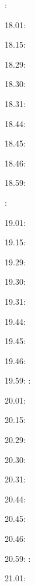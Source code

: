 \documentclass[italian]{article}
\begin{document}
:    

18.01:      

18.15:      

18.29:      

18.30:     

18.31:     

18.44:     

18.45:     

18.46:     

18.59:     

:    

19.01:      

19.15:      

19.29:      

19.30:     

19.31:     

19.44:     

19.45:     

19.46:     

19.59:     
:    

20.01:      

20.15:      

20.29:      

20.30:     

20.31:     

20.44:     

20.45:     

20.46:     

20.59:     
:    

21.01:      
\end{document}
